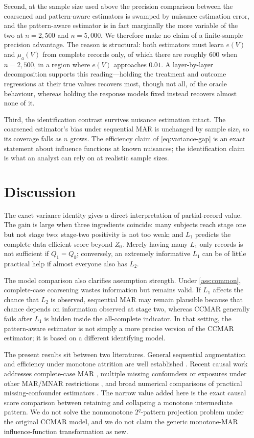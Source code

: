\documentclass[11pt]{article}
\theoremstyle{definition}
\newcommand{\1}{\mathbf{1}}
\begin{document}
Second, at the sample size used above the precision comparison between the
coarsened and pattern-aware estimators is swamped by nuisance estimation error,
and the pattern-aware estimator is in fact marginally the more variable of the
two at $n=2{,}500$ and $n=5{,}000$. We therefore make no claim of a
finite-sample precision advantage. The reason is structural: both estimators
must learn $e(V)$ and $\mu_a(V)$ from complete records only, of which there are
roughly $600$ when $n=2{,}500$, in a region where $e(V)$ approaches $0.01$. A
layer-by-layer decomposition supports this reading---holding the treatment and
outcome regressions at their true values recovers most, though not all, of the
oracle behaviour, whereas holding the response models fixed instead recovers
almost none of it.

Third, the identification contrast survives nuisance estimation intact. The
coarsened estimator's bias under sequential MAR is unchanged by sample size, so
its coverage falls as $n$ grows. The efficiency claim of
\cref{eq:variance-gap} is an exact statement about influence functions at known
nuisances; the identification claim is what an analyst can rely on at realistic
sample sizes.

\section{Discussion}

The exact variance identity gives a direct interpretation of partial-record value. The gain is large when three ingredients coincide: many subjects reach stage one but not stage two; stage-two positivity is not too weak; and $L_1$ predicts the complete-data efficient score beyond $Z_0$. Merely having many $L_1$-only records is not sufficient if $Q_1=Q_0$; conversely, an extremely informative $L_1$ can be of little practical help if almost everyone also has $L_2$.

The model comparison also clarifies assumption strength. Under \cref{ass:common}, complete-case coarsening wastes information but remains valid. If $L_1$ affects the chance that $L_2$ is observed, sequential MAR may remain plausible because that chance depends on information observed at stage two, whereas CCMAR generally fails after $L_1$ is hidden inside the all-complete indicator. In that setting, the pattern-aware estimator is not simply a more precise version of the CCMAR estimator; it is based on a different identifying model.

The present results sit between two literatures. General sequential augmentation and efficiency under monotone attrition are well established \citep{rrz1994,gill1997,barnwell2025}. Recent causal work addresses complete-case MAR \citep{levis2025}, multiple missing confounders or exposures under other MAR/MNAR restrictions \citep{wen2026}, and broad numerical comparisons of practical missing-confounder estimators \citep{benz2025,williamson2026}. The narrow value added here is the exact causal score comparison between retaining and collapsing a monotone intermediate pattern. We do not solve the nonmonotone $2^q$-pattern projection problem under the original CCMAR model, and we do not claim the generic monotone-MAR influence-function transformation as new.
\end{document}
